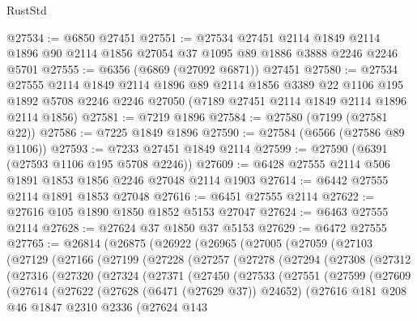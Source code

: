 \begin{lexlean}{RustStd}
\begin{coremodule}
{\begin{coremodule}
{{{{{{{{{{{{{{{{{{{{{{{{{{@27534 := @6850 @27451
@27551 := @27534
    @27451
    @2114
    @1849
    @2114
    @1896
    @90
    @2114
    @1856
    @27054
    @37
    @1095
    @89
    @1886
    @3888
    @2246
    @2246
    @5701
@27555 := @6356 (@6869 (@27092 @6871)) @27451
@27580 := @27534
    @27555
    @2114
    @1849
    @2114
    @1896
    @89
    @2114
    @1856
    @3389
    @22
    @1106
    @195
    @1892
    @5708
    @2246
    @2246
    @27050
    (@7189 @27451 @2114 @1849 @2114 @1896 @2114 @1856)
@27581 := @7219 @1896
@27584 := @27580 (@7199 (@27581 @22))
@27586 := @7225 @1849 @1896
@27590 := @27584 (@6566 (@27586 @89 @1106))
@27593 := @7233 @27451 @1849 @2114
@27599 := @27590 (@6391 (@27593 @1106 @195 @5708 @2246))
@27609 := @6428 @27555 @2114 @506 @1891 @1853 @1856 @2246 @27048 @2114 @1903
@27614 := @6442 @27555 @2114 @1891 @1853 @27048
@27616 := @6451 @27555 @2114
@27622 := @27616 @105 @1890 @1850 @1852 @5153 @27047
@27624 := @6463 @27555 @2114
@27628 := @27624 @37 @1850 @37 @5153
@27629 := @6472 @27555
@27765 := @26814
    (@26875
      (@26922
        (@26965
          (@27005
            (@27059
              (@27103
                (@27129
                  (@27166
                    (@27199
                      (@27228
                        (@27257
                          (@27278
                            (@27294
                              (@27308
                                (@27312
                                  (@27316
                                    (@27320
                                      (@27324
                                        (@27371
                                          (@27450
                                            (@27533
                                              (@27551
                                                (@27599
                                                  (@27609
                                                    (@27614
                                                      (@27622
                                                        (@27628 (@6471 (@27629 @37)) @24652)
                                                        (@27616
                                                          @181
                                                          @208
                                                          @46
                                                          @1847
                                                          @2310
                                                          @2336
                                                          (@27624
                                                            @143
}}}}}}}}}}}}}}}}}}}}}}}}}}
\end{coremodule}}
\end{coremodule}
\end{lexlean}
